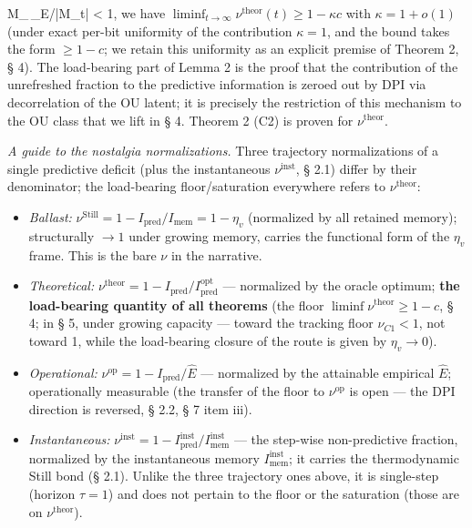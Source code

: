 \documentclass[12pt]{iopart}
\providecommand{\tightlist}{\setlength{\itemsep}{0pt}\setlength{\parskip}{0pt}}
\begin{document}
M_{}\,\tau_E/|M_{\le t}| < 1\), we have \(\liminf_{t\to\infty}\nu^{\text{theor}}(t) \ge 1 - \kappa c\) with \(\kappa = 1+o(1)\) (under exact per-bit uniformity of the contribution \(\kappa = 1\), and the bound takes the form \(\ge 1-c\); we retain this uniformity as an explicit premise of Theorem 2, § 4). The load-bearing part of Lemma 2 is the proof that the contribution of the unrefreshed fraction to the predictive information is zeroed out by DPI via decorrelation of the OU latent; it is precisely the restriction of this mechanism to the OU class that we lift in § 4. Theorem 2 (C2) is proven for \(\nu^{\text{theor}}\).



\emph{A guide to the nostalgia normalizations.} Three trajectory normalizations of a single predictive deficit (plus the instantaneous \(\nu^{\text{inst}}\), § 2.1) differ by their denominator; the load-bearing floor/saturation everywhere refers to \(\nu^{\text{theor}}\):



\begin{itemize}

\tightlist

\item

  \emph{Ballast:} \(\nu^{\text{Still}} = 1 - I_{\text{pred}}/I_{\text{mem}} = 1 - \eta_v\) (normalized by all retained memory); structurally \(\to 1\) under growing memory, carries the functional form of the \(\eta_v\) frame. This is the bare \(\nu\) in the narrative.

\item

  \emph{Theoretical:} \(\nu^{\text{theor}} = 1 - I_{\text{pred}}/I_{\text{pred}}^{\text{opt}}\) --- normalized by the oracle optimum; \textbf{the load-bearing quantity of all theorems} (the floor \(\liminf\nu^{\text{theor}} \ge 1-c\), § 4; in § 5, under growing capacity --- toward the tracking floor \(\nu_{C1} < 1\), not toward 1, while the load-bearing closure of the route is given by \(\eta_v \to 0\)).

\item

  \emph{Operational:} \(\nu^{\text{op}} = 1 - I_{\text{pred}}/\hat E\) --- normalized by the attainable empirical \(\hat E\); operationally measurable (the transfer of the floor to \(\nu^{\text{op}}\) is open --- the DPI direction is reversed, § 2.2, § 7 item iii).

\item

  \emph{Instantaneous:} \(\nu^{\text{inst}} = 1 - I_{\text{pred}}^{\text{inst}}/I_{\text{mem}}^{\text{inst}}\) --- the step-wise non-predictive fraction, normalized by the instantaneous memory \(I_{\text{mem}}^{\text{inst}}\); it carries the thermodynamic Still bond (§ 2.1). Unlike the three trajectory ones above, it is single-step (horizon \(\tau = 1\)) and does not pertain to the floor or the saturation (those are on \(\nu^{\text{theor}}\)).

\end{itemize}
\end{document}
